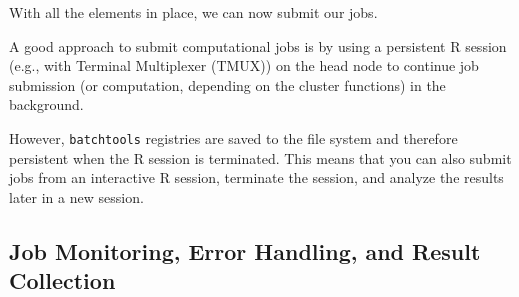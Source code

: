 \begin{Shaded}
\begin{Highlighting}[]
\OtherTok{=} \NormalTok{(} \NormalTok{, } \NormalTok{, } \NormalTok{)}
\end{Highlighting}
\end{Shaded}

With all the elements in place, we can now submit our jobs.

\begin{Shaded}
\begin{Highlighting}[]
\NormalTok{(}

\NormalTok{(}
\end{Highlighting}
\end{Shaded}

\begin{tcolorbox}[enhanced jigsaw, opacitybacktitle=0.6, rightrule=.15mm, opacityback=0, arc=.35mm, breakable, titlerule=0mm, colframe=quarto-callout-tip-color-frame, coltitle=black, bottomrule=.15mm, toprule=.15mm, colback=white, colbacktitle=quarto-callout-tip-color!10!white, bottomtitle=1mm, toptitle=1mm, title=\textcolor{quarto-callout-tip-color}{\faLightbulb}\hspace{0.5em}{Submitting Jobs}, leftrule=.75mm, left=2mm]

A good approach to submit computational jobs is by using a persistent R
session (e.g., with Terminal Multiplexer (TMUX)) on the head node to
continue job submission (or computation, depending on the cluster
functions) in the background.

However, \texttt{batchtools} registries are saved to the file system and
therefore persistent when the R session is terminated. This means that
you can also submit jobs from an interactive R session, terminate the
session, and analyze the results later in a new session.

\end{tcolorbox}

\hypertarget{sec-batchtools-monitoring}{%
\subsection{Job Monitoring, Error Handling, and Result
Collection}\label{sec-batchtools-monitoring}}

